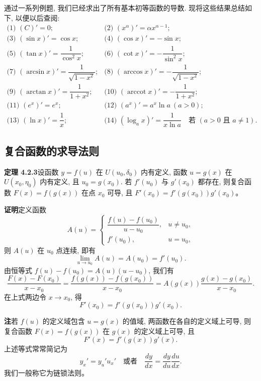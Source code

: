 \documentclass[UTF8, 12pt, fontset=fandol, oneside]{ctexart}
\begin{document}
通过一系列例题, 我们已经求出了所有基本初等函数的导数. 现将这些结果总结如下, 以便以后查阅:
\[
\begin{array}{ll}
  \text{(1) }(C)'=0; &
  \text{(2) }(x^\alpha)'=\alpha x^{\alpha-1};\\[4pt]
  \text{(3) }(\sin x)'=\cos x; &
  \text{(4) }(\cos x)'=-\sin x;\\[4pt]
  \text{(5) }(\tan x)'=\dfrac1{\cos^2x}; &
  \text{(6) }(\cot x)'=-\dfrac1{\sin^2x};\\[8pt]
  \text{(7) }(\arcsin x)'=\dfrac1{\sqrt{1-x^2}}; &
  \text{(8) }(\arccos x)'=-\dfrac1{\sqrt{1-x^2}};\\[8pt]
  \text{(9) }(\arctan x)'=\dfrac1{1+x^2}; &
  \text{(10) }(\operatorname{arccot}x)'=-\dfrac1{1+x^2};\\[8pt]
  \text{(11) }(e^x)'=e^x; &
  \text{(12) }(a^x)'=a^x\ln a\ (a>0);\\[4pt]
  \text{(13) }(\ln x)'=\dfrac1x; &
  \text{(14) }(\log_a x)'=\dfrac1{x\ln a}\quad\text{若 }(a>0\text{ 且 }a\ne1).
\end{array}
\]

\subsection{复合函数的求导法则}

\noindent\textbf{定理 4.2.3}\quad 设函数 $y=f(u)$ 在 $U(u_0,\delta_0)$ 内有定义, 函数 $u=g(x)$ 在 $U(x_0,\eta_0)$ 内有定义, 且 $u_0=g(x_0)$. 若 $f'(u_0)$ 与 $g'(x_0)$ 都存在, 则复合函数 $F(x)=f(g(x))$ 在点 $x_0$ 可导, 且 $F'(x_0)=f'(g(x_0))g'(x_0)$。

\noindent\textbf{证明}\quad 定义函数
\[
  A(u)=
  \begin{cases}
    \dfrac{f(u)-f(u_0)}{u-u_0}, & u\ne u_0,\\[8pt]
    f'(u_0), & u=u_0,
  \end{cases}
\]
则 $A(u)$ 在 $u_0$ 点连续, 即有
\[
  \lim_{u\to u_0}A(u)=A(u_0)=f'(u_0).
\]
由恒等式 $f(u)-f(u_0)=A(u)(u-u_0)$, 我们有
\[
  \frac{F(x)-F(x_0)}{x-x_0}
  =
  \frac{f(g(x))-f(g(x_0))}{x-x_0}
  =
  A(g(x))\frac{g(x)-g(x_0)}{x-x_0}.
\]
在上式两边令 $x\to x_0$, 得
\[
  F'(x_0)=f'(g(x_0))g'(x_0).
\]

\noindent\textbf{注}\quad 若 $f(u)$ 的定义域包含 $u=g(x)$ 的值域, 两函数在各自的定义域上可导, 则复合函数 $F(x)=f(g(x))$ 在 $g(x)$ 的定义域上可导, 且
\[
  F'(x)=f'(g(x))g'(x).
\]
上述等式常常简记为
\[
  y_x'=y_u'u_x'
  \quad\text{或者}\quad
  \frac{dy}{dx}=\frac{dy}{du}\frac{du}{dx}.
\]
我们一般称它为链锁法则。
\end{document}
